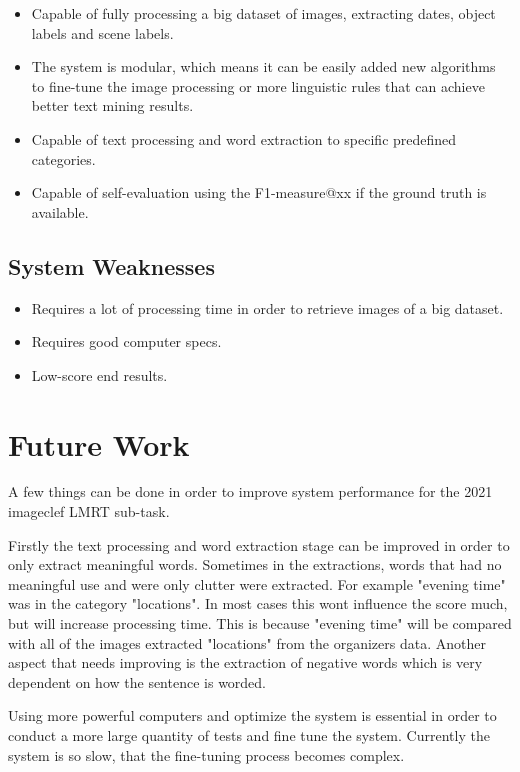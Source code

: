 \begin{itemize}
    \itemsep0em
    \item Capable of fully processing a big dataset of images, extracting dates, object labels and scene labels.
    \item The system is modular, which means it can be easily added new algorithms to fine-tune the image processing or more linguistic rules that can achieve better text mining results.
    \item Capable of text processing and word extraction to specific predefined categories.
    \item Capable of self-evaluation using the F1-measure@xx if the ground truth is available.
\end{itemize}


\subsection{System Weaknesses}

\begin{itemize}
    \itemsep0em
    \item Requires a lot of processing time in order to retrieve images of a big dataset.
    \item Requires good computer specs.
    \item Low-score end results.
\end{itemize}

\section{Future Work}

A few things can be done in order to improve system performance for the 2021 imageclef LMRT sub-task.

Firstly the text processing and word extraction stage can be improved in order to only extract meaningful words. Sometimes in the extractions, words that had no meaningful use and were only clutter were extracted. For example "evening time" was in the category "locations". In most cases this wont influence the score much, but will increase processing time. This is because "evening time" will be compared with all of the images extracted "locations" from the organizers data. Another aspect that needs improving is the extraction of negative words which is very dependent on how the sentence is worded.

Using more powerful computers and optimize the system is essential in order to conduct a more large quantity of tests and fine tune the system. Currently the system is so slow, that the fine-tuning process becomes complex.

